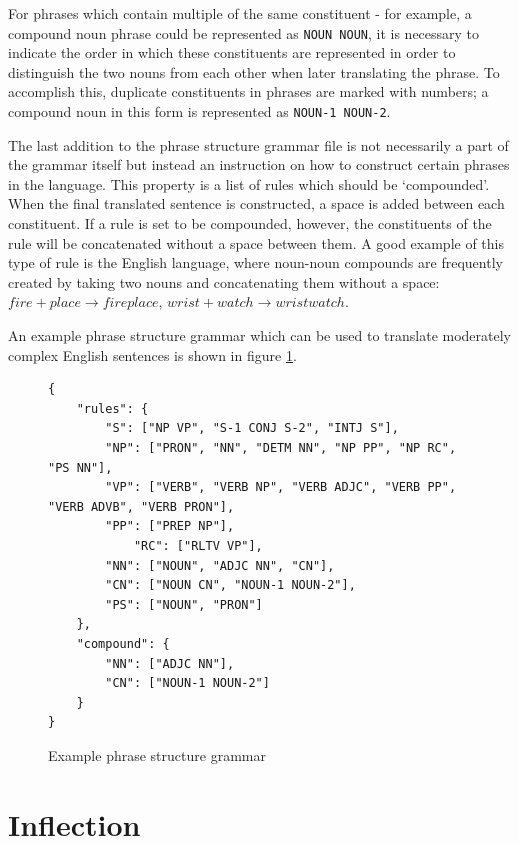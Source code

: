 \documentclass{report}
\begin{document}
	For phrases which contain multiple of the same constituent - for example, a compound noun phrase could be represented as \texttt{NOUN NOUN}, it is necessary to indicate the order in which these constituents are represented in order to distinguish the two nouns from each other when later translating the phrase. To accomplish this, duplicate constituents in phrases are marked with numbers; a compound noun in this form is represented as \texttt{NOUN-1 NOUN-2}.
	
	The last addition to the phrase structure grammar file is not necessarily a part of the grammar itself but instead an instruction on how to construct certain phrases in the language. This property is a list of rules which should be `compounded'. When the final translated sentence is constructed, a space is added between each constituent. If a rule is set to be compounded, however, the constituents of the rule will be concatenated without a space between them. A good example of this type of rule is the English language, where noun-noun compounds are frequently created by taking two nouns and concatenating them without a space: $fire + place \rightarrow fireplace$, $wrist + watch \rightarrow wristwatch$.

	An example phrase structure grammar which can be used to translate moderately complex English sentences is shown in figure \ref{example phrase structure grammar}.
	
	\begin{figure}
		\caption{Example phrase structure grammar}
		\label{example phrase structure grammar}
		\begin{tcolorbox}
			\begin{lstlisting}[breaklines=true,tabsize=2]
{
	"rules": {
		"S": ["NP VP", "S-1 CONJ S-2", "INTJ S"],
		"NP": ["PRON", "NN", "DETM NN", "NP PP", "NP RC", "PS NN"],
		"VP": ["VERB", "VERB NP", "VERB ADJC", "VERB PP", "VERB ADVB", "VERB PRON"],
		"PP": ["PREP NP"],
			"RC": ["RLTV VP"],
		"NN": ["NOUN", "ADJC NN", "CN"],
		"CN": ["NOUN CN", "NOUN-1 NOUN-2"],
		"PS": ["NOUN", "PRON"]
	},
	"compound": {
		"NN": ["ADJC NN"],
		"CN": ["NOUN-1 NOUN-2"]
	}
}
			\end{lstlisting}
		\end{tcolorbox}
	\end{figure}
	
	\section{Inflection}
   
   \printbibliography
\end{document}
